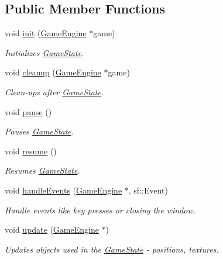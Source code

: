 \subsection*{Public Member Functions}
\begin{DoxyCompactItemize}
\item 
void \mbox{\hyperlink{class_serve_state_ab39cdbf8c6fe8bbcf67d29033c3e2c15}{init}} (\mbox{\hyperlink{class_game_engine}{Game\+Engine}} $\ast$game)
\begin{DoxyCompactList}\small\item\em Initializes \mbox{\hyperlink{class_game_state}{Game\+State}}. \end{DoxyCompactList}\item 
void \mbox{\hyperlink{class_serve_state_a3516119feb2bf386b3686867da412328}{cleanup}} (\mbox{\hyperlink{class_game_engine}{Game\+Engine}} $\ast$game)
\begin{DoxyCompactList}\small\item\em Clean-\/ups after \mbox{\hyperlink{class_game_state}{Game\+State}}. \end{DoxyCompactList}\item 
void \mbox{\hyperlink{class_serve_state_ab3a85411b4cc260cfede50e3aa10573c}{pause}} ()
\begin{DoxyCompactList}\small\item\em Pauses \mbox{\hyperlink{class_game_state}{Game\+State}}. \end{DoxyCompactList}\item 
void \mbox{\hyperlink{class_serve_state_ae9a501a1f103b02685fdd4caac5685e5}{resume}} ()
\begin{DoxyCompactList}\small\item\em Resumes \mbox{\hyperlink{class_game_state}{Game\+State}}. \end{DoxyCompactList}\item 
void \mbox{\hyperlink{class_serve_state_a8f372bdf6b72e8d4ae9eaa1b45a4d844}{handle\+Events}} (\mbox{\hyperlink{class_game_engine}{Game\+Engine}} $\ast$, sf\+::\+Event)
\begin{DoxyCompactList}\small\item\em Handle events like key presses or closing the window. \end{DoxyCompactList}\item 
void \mbox{\hyperlink{class_serve_state_ac227c95e6d1ed3f3d1fc01c4035db847}{update}} (\mbox{\hyperlink{class_game_engine}{Game\+Engine}} $\ast$)
\begin{DoxyCompactList}\small\item\em Updates objects used in the \mbox{\hyperlink{class_game_state}{Game\+State}} -\/ positions, textures. \end{DoxyCompactList}\item 

\end{DoxyCompactItemize}
